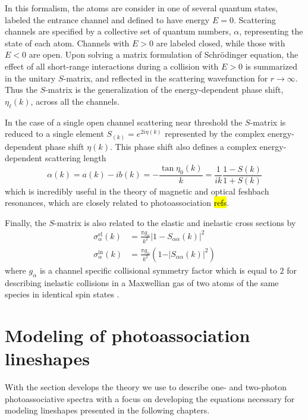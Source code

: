 In this formalism, the atoms are consider in one of several quantum states, labeled the entrance channel and defined to have energy $E=0$.
Scattering channels are specified by a collective set of quantum numbers, $\alpha$, representing the state of each atom.
Channels with $E>0$ are labeled closed, while those with $E<0$ are open.
Upon solving a matrix formulation of Schr\"{o}dinger equation, the effect of all short-range interactions during a collision with $E > 0$ is summarized in the unitary $S$-matrix, and reflected in the scattering wavefunction for $r\rightarrow\infty$. 
Thus the $S$-matrix is the generalization of the energy-dependent phase shift, $\eta_{\ell}(k)$, across all the channels.

In the case of a single open channel scattering near threshold the $S$-matrix is reduced to a single element $S_(k)=e^{2i\eta(k)}$ represented by the complex energy-dependent phase shift $\eta(k)$.
This phase shift also defines a complex energy-dependent scattering length
\begin{equation}
	\alpha(k) = a(k) - i b(k) = -\frac{\tan \eta_0(k)}{k} = \frac{1}{ik} \frac{1-S(k)}{1+S(k)}
\end{equation}
which is incredibly useful in the theory of magnetic and optical feshbach resonances, which are closely related to photoassociation \hl{refs}.

Finally, the $S$-matrix is also related to the elastic and inelastic cross sections by
\begingroup
\addtolength{\jot}{1em}
\begin{align}
	\sigma^{\text{el}}_{\alpha}(k) &= \frac{\pi g_{\alpha}}{k^2} \vert 1 - S_{\alpha \alpha}(k) \vert^2 \\
	\label{eq:sigin}	
	\sigma^{\text{in}}_{\alpha}(k) &= \frac{\pi g_{\alpha}}{k^2} \left( 1 - \vert S_{\alpha \alpha}(k) \vert^2 \right)
\end{align}	
\endgroup
where $g_{\alpha}$ is a channel specific collisional symmetry factor which is equal to $2$ for describing inelastic collisions in a Maxwellian gas of two atoms of the same species in identical spin states \cite{Chin2010}.


\section{Modeling of photoassociation lineshapes} \label{sec:bohn_and_julienne}

With the  section develops the theory we use to describe one- and two-photon photoassociative spectra with a focus on developing the equations necessary for modeling lineshapes presented in the following chapters.

